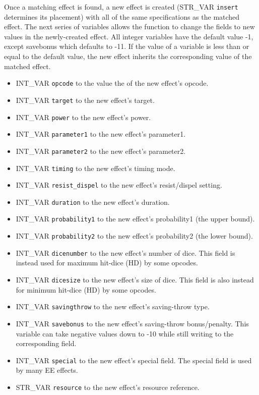 \documentclass{article}
\begin{document}
Once a matching effect is found, a new effect is created (STR_VAR
\verb+insert+ determines its placement) with all of the same
specifications as the matched effect. The next series of variables
allows the function to change the fields to new values in the
newly-created effect. All integer variables have the default value -1,
except savebonus which defaults to -11. If the value of a variable is
less than or equal to the default value, the new effect inherits the
corresponding value of the matched effect.

\begin{itemize}
\item INT_VAR \verb+opcode+ to the value the of the new effect's opcode.
\item INT_VAR \verb+target+ to the new effect's target.
\item INT_VAR \verb+power+ to the new effect's power.
\item INT_VAR \verb+parameter1+ to the new effect's parameter1.
\item INT_VAR \verb+parameter2+ to the new effect's parameter2.
\item INT_VAR \verb+timing+ to the new effect's timing mode.
\item INT_VAR \verb+resist_dispel+ to the new effect's resist/dispel setting.
\item INT_VAR \verb+duration+ to the new effect's duration.
\item INT_VAR \verb+probability1+ to the new effect's probability1 (the upper bound).
\item INT_VAR \verb+probability2+ to the new effect's probability2 (the lower bound).
\item INT_VAR \verb+dicenumber+ to the new effect's number of dice. This field is instead used for maximum hit-dice (HD) by some opcodes.
\item INT_VAR \verb+dicesize+ to the new effect's size of dice. This field is also instead for minimum hit-dice (HD) by some opcodes.
\item INT_VAR \verb+savingthrow+ to the new effect's saving-throw type.
\item INT_VAR \verb+savebonus+ to the new effect's saving-throw bonus/penalty. This variable can take negative values down to -10 while still writing to the corresponding field.
\item INT_VAR \verb+special+ to the new effect's special field. The special field is used by many EE effects.
\item STR_VAR \verb+resource+ to the new effect's resource reference.
\end{itemize}
\\
\end{document}
